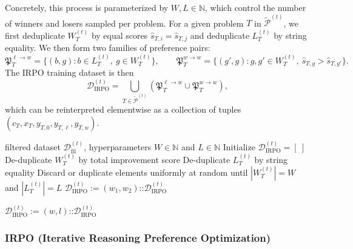 Concretely, this process is parameterized by $W,L \in \mathbb{N}$, which control the number of winners and losers sampled per problem. For a given problem $T$ in $\widetilde{\mathcal{P}}^{(t)}$, we first deduplicate $W_T^{(t)}$ by equal scores $\widehat{s}_{T,i} = \widehat{s}_{T,j}$ and deduplicate $L_T^{(t)}$ by string equality. We then form two families of preference pairs:
\[
\mathfrak{P}^{\ell\to w}_T=\{(b,g): b\in L_T^{(t)},\ g\in W_T^{(t)}\}, \qquad
\mathfrak{P}^{w\to w}_T=\{(g',g): g,g'\in W_T^{(t)},\ \widehat{s}_{T,g}>\widehat{s}_{T,g'}\}.
\]
The IRPO training dataset is then
\[\mathcal{D}_{\text{IRPO}}^{(t)} = \bigcup_{T \in \widetilde{\mathcal{P}}^{(t)}} (\mathfrak{P}^{\ell\to w}_T \cup \mathfrak{P}^{w\to w}_T),\]
which can be reinterpreted elementwise as a collection of tuples $(c_T,x_T,y_{T,0},y_{T,\ell},y_{T,w})$.


\begin{algorithm}[tb]
  \caption{Preference Pair Creation}
  \label{alg:pref_pair_creation}
  \begin{algorithmic}
     filtered dataset $\mathcal{D}_{\text{fil}}^{(t)}$, hyperparameters $W \in \mathbb{N}$ and $L \in \mathbb{N}$
    \STATE Initialize $\mathcal{D}_{\text{IRPO}}^{(t)} = [ \ ]$
        \STATE De-duplicate $W_T^{(t)}$ by total improvement score
        \STATE De-duplicate $L_T^{(t)}$ by string equality
        \STATE Discard or duplicate elements uniformly at random until $|W_T^{(t)}|=W$ and $|L_T^{(t)}|=L$
                    \STATE $\mathcal{D}_{\text{IRPO}}^{(t)} := (w_1, w_2) \texttt{::} \mathcal{D}_{\text{IRPO}}^{(t)}$
                \ENDIF
            \ENDFOR
        \ENDFOR

                \STATE $\mathcal{D}_{\text{IRPO}}^{(t)} := (w, l) \texttt{::} \mathcal{D}_{\text{IRPO}}^{(t)}$
            \ENDFOR
        \ENDFOR
    \ENDFOR
  \end{algorithmic}
\end{algorithm}









\subsubsection{IRPO (Iterative Reasoning Preference Optimization)}
\label{sec:irpo}


